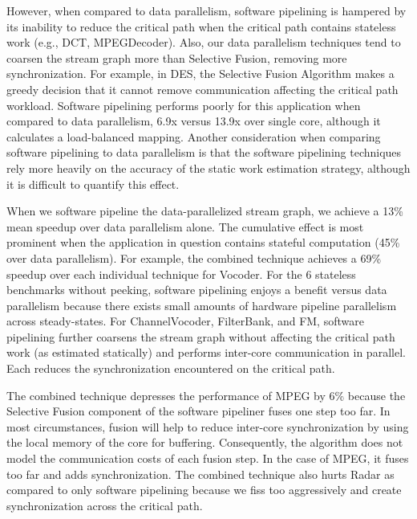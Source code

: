 However, when compared to data parallelism, software pipelining is
hampered by its inability to reduce the critical path when the
critical path contains stateless work (e.g., DCT, MPEGDecoder).  Also,
our data parallelism techniques tend to coarsen the stream graph more
than Selective Fusion, removing more synchronization.  For example, in
DES, the Selective Fusion Algorithm makes a greedy decision that it
cannot remove communication affecting the critical path workload.
Software pipelining performs poorly for this application when compared
to data parallelism, 6.9x versus 13.9x over single core, although it
calculates a load-balanced mapping.  Another consideration when
comparing software pipelining to data parallelism is that the software
pipelining techniques rely more heavily on the accuracy of the static
work estimation strategy, although it is difficult to quantify this
effect.

When we software pipeline the data-parallelized stream graph, we
achieve a 13\% mean speedup over data parallelism alone. The
cumulative effect is most prominent when the application in question
contains stateful computation (45\% over data parallelism).  For
example, the combined technique achieves a 69\% speedup over each
individual technique for Vocoder. For the 6 stateless benchmarks
without peeking, software pipelining enjoys a benefit versus data
parallelism because there exists small amounts of hardware pipeline
parallelism across steady-states.  For ChannelVocoder, FilterBank, and
FM, software pipelining further coarsens the stream graph without
affecting the critical path work (as estimated statically) and
performs inter-core communication in parallel.  Each reduces the
synchronization encountered on the critical path.

The combined technique depresses the performance of MPEG by 6\%
because the Selective Fusion component of the software pipeliner fuses
one step too far.  In most circumstances, fusion will help to reduce
inter-core synchronization by using the local memory of the core for
buffering. Consequently, the algorithm does not model the
communication costs of each fusion step. In the case of MPEG, it fuses
too far and adds synchronization. The combined technique also hurts
Radar as compared to only software pipelining because we fiss too
aggressively and create synchronization across the critical path.


